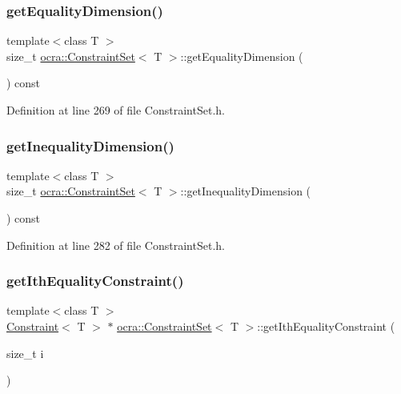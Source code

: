 \subsubsection{\texorpdfstring{get\+Equality\+Dimension()}{getEqualityDimension()}}
{\footnotesize\ttfamily template$<$class T $>$ \\
size\+\_\+t \hyperlink{classocra_1_1ConstraintSet}{ocra\+::\+Constraint\+Set}$<$ T $>$\+::get\+Equality\+Dimension (\begin{DoxyParamCaption}{ }\end{DoxyParamCaption}) const\hspace{0.3cm}{\ttfamily [inline]}}



Definition at line 269 of file Constraint\+Set.\+h.

\hypertarget{classocra_1_1ConstraintSet_a3d0134190b555f7176a719424c0401eb}{}\label{classocra_1_1ConstraintSet_a3d0134190b555f7176a719424c0401eb} 
\subsubsection{\texorpdfstring{get\+Inequality\+Dimension()}{getInequalityDimension()}}
{\footnotesize\ttfamily template$<$class T $>$ \\
size\+\_\+t \hyperlink{classocra_1_1ConstraintSet}{ocra\+::\+Constraint\+Set}$<$ T $>$\+::get\+Inequality\+Dimension (\begin{DoxyParamCaption}{ }\end{DoxyParamCaption}) const\hspace{0.3cm}{\ttfamily [inline]}}



Definition at line 282 of file Constraint\+Set.\+h.

\hypertarget{classocra_1_1ConstraintSet_a5b7d67d57cc92ade65d84fe36d94bbe0}{}\label{classocra_1_1ConstraintSet_a5b7d67d57cc92ade65d84fe36d94bbe0} 
\subsubsection{\texorpdfstring{get\+Ith\+Equality\+Constraint()}{getIthEqualityConstraint()}}
{\footnotesize\ttfamily template$<$class T $>$ \\
\hyperlink{classocra_1_1Constraint}{Constraint}$<$ T $>$ $\ast$ \hyperlink{classocra_1_1ConstraintSet}{ocra\+::\+Constraint\+Set}$<$ T $>$\+::get\+Ith\+Equality\+Constraint (\begin{DoxyParamCaption}\item[{size\+\_\+t}]{i }\end{DoxyParamCaption})\hspace{0.3cm}{\ttfamily [inline]}}

